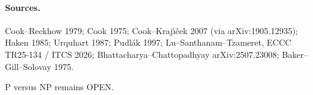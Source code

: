 \documentclass[11pt]{article}
\begin{document}
\paragraph{Sources.} Cook--Reckhow 1979; Cook 1975; Cook--Kraj\'\i\v{c}ek 2007 (via arXiv:1905.12935); Haken 1985; Urquhart 1987; Pudl\'ak 1997;
Lu--Santhanam--Tzameret, ECCC TR25-134 / ITCS 2026; Bhattacharya--Chattopadhyay arXiv:2507.23008; Baker--Gill--Solovay 1975.

\noindent P versus NP remains OPEN.
\end{document}
